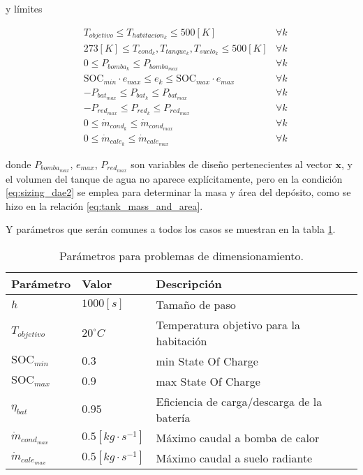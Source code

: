 y límites

\begin{align}
	 & T_{objetivo} \leq T_{habitacion_k} \leq 500[K]                                    & \forall k \\
	 & 273[K] \leq T_{cond_k}, T_{tanque_k}, T_{suelo_k} \leq 500[K]                     & \forall k \\
	 & 0 \leq P_{bomba_k} \leq P_{bomba_{max}} \quad                                     & \forall k \\
	 & \text{SOC}_{min} \cdot e_{max} \leq e_k \leq \text{SOC}_{max} \cdot e_{max} \quad & \forall k \\
	 & -P_{bat_{max}} \leq P_{bat_k} \leq P_{bat_{max}} \quad                            & \forall k \\
	 & -P_{red_{max}} \leq P_{red_k} \leq P_{red_{max}} \quad                            & \forall k \\
	 & 0 \leq \dot{m}_{cond_k} \leq \dot{m}_{cond_{max}} \quad                           & \forall k \\
	 & 0 \leq \dot{m}_{cale_k} \leq \dot{m}_{cale_{max}} \quad                           & \forall k
\end{align}

donde $P_{bomba_{max}}$, $e_{max}$, $P_{red_{max}}$ son variables de diseño
pertenecientes al vector $\mathbf{x}$, y el volumen del tanque de agua no
aparece explícitamente, pero en la condición \eqref{eq:sizing_dae2} se emplea
para determinar la masa y área del depósito, como se hizo en la relación
\eqref{eq:tank_mass_and_area}.

Y parámetros que serán comunes a todos los casos se muestran en la tabla
\ref{tab:sizing_optimization_data}.

\begin{table}[ht]
	\centering
	\caption{Parámetros para problemas de dimensionamiento.}
	\label{tab:sizing_optimization_data}
	\begin{tabular}{@{}lll@{}}
		\toprule
		\textbf{Parámetro}     & \textbf{Valor}         & \textbf{Descripción}                       \\
		\midrule
		$h$                    & $1000[s]$              & Tamaño de paso                             \\
		$T_{objetivo}$         & $20 ^\circ C$          & Temperatura objetivo para la habitación    \\
		$\text{SOC}_{min}$     & $0.3$                  & min State Of Charge                        \\
		$\text{SOC}_{max}$     & $0.9$                  & max State Of Charge                        \\
		$\eta_{bat}$           & $0.95$                 & Eficiencia de carga/descarga de la batería \\
		$\dot{m}_{cond_{max}}$ & $0.5[kg \cdot s^{-1}]$ & Máximo caudal a bomba de calor             \\
		$\dot{m}_{cale_{max}}$ & $0.5[kg \cdot s^{-1}]$ & Máximo caudal a suelo radiante             \\
		\bottomrule
	\end{tabular}
\end{table}


